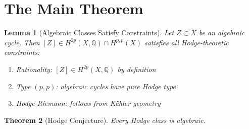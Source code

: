 \documentclass[12pt]{article}
\newtheorem{theorem}{Theorem}
\newtheorem{lemma}[theorem]{Lemma}
\begin{document}
\section{The Main Theorem}

\begin{lemma}[Algebraic Classes Satisfy Constraints]
Let $Z \subset X$ be an algebraic cycle. Then $[Z] \in H^{2p}(X,\mathbb{Q}) \cap H^{p,p}(X)$
satisfies all Hodge-theoretic constraints:
\begin{enumerate}
\item Rationality: $[Z] \in H^{2p}(X,\mathbb{Q})$ by definition
\item Type $(p,p)$: algebraic cycles have pure Hodge type
\item Hodge-Riemann: follows from K\"ahler geometry
\end{enumerate}
\end{lemma}

\begin{theorem}[Hodge Conjecture]
Every Hodge class is algebraic.
\end{theorem}
\end{document}
